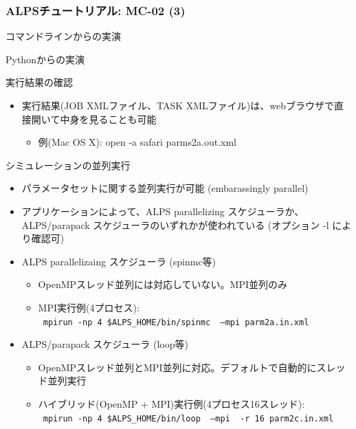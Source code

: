\begin{frame}
  \frametitle{ALPSチュートリアル: MC-02 (3)}
  \begin{center}
    \begin{block}{}
      コマンドラインからの実演
    \end{block}
    \begin{block}{}
      Pythonからの実演
    \end{block}
  \end{center}
\end{frame}

\begin{frame}{実行結果の確認}
  \begin{itemize}
    \item 実行結果(JOB XMLファイル、TASK XMLファイル)は、webブラウザで直接開いて中身を見ることも可能
      \begin{itemize}
      \item 例(Mac OS X): open -a safari parms2a.out.xml
      \end{itemize}
  \end{itemize}
\end{frame}

\begin{frame}{シミュレーションの並列実行}
  \begin{itemize}
    \item パラメータセットに関する並列実行が可能 (embarassingly parallel)
    \item アプリケーションによって、ALPS parallelizing スケジューラか、ALPS/parapack スケジューラのいずれかが使われている (オプション -l により確認可)
    \item ALPS parallelizaing スケジューラ (spinmc等)
      \begin{itemize}
        \item OpenMPスレッド並列には対応していない。MPI並列のみ
        \item MPI実行例(4プロセス): \\ {\tt {\color{red} mpirun -np 4} \$ALPS\_HOME/bin/spinmc {\color{red} --mpi} parm2a.in.xml}
      \end{itemize}
    \item ALPS/parapack スケジューラ (loop等)
      \begin{itemize}
        \item OpenMPスレッド並列とMPI並列に対応。デフォルトで自動的にスレッド並列実行
        \item ハイブリッド(OpenMP + MPI)実行例(4プロセス16スレッド): \\ {\tt {\color{red} mpirun -np 4} \$ALPS\_HOME/bin/loop {\color{red} --mpi} {\color{red} -r 16} parm2c.in.xml}
      \end{itemize}
  \end{itemize}
\end{frame}

